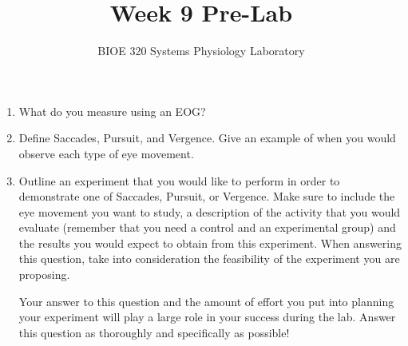 \documentclass{article}
\title{Week 9 Pre-Lab}
\author{BIOE 320 Systems Physiology Laboratory}
\date{}
\begin{document}
\maketitle
\large

\begin{enumerate}
	\item What do you measure using an EOG?
	\item Define Saccades, Pursuit, and Vergence. Give an example of when you would observe each type of eye movement.
	\item Outline an experiment that you would like to perform in order to demonstrate one of Saccades, Pursuit, or Vergence. Make sure to include the eye movement you want to study, a description of the activity that you would evaluate (remember that you need a control and an experimental group) and the results you would expect to obtain from this experiment. When answering this question, take into consideration the feasibility of the experiment you are proposing.
	\begin{info}
	Your answer to this question and the amount of effort you put into planning your experiment will play a large role in your success during the lab. Answer this question as thoroughly and specifically as possible!	
	\end{info}

\end{enumerate}
\end{document}
